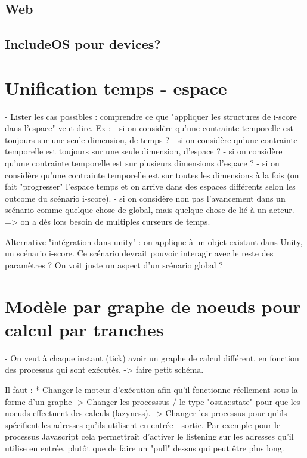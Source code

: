 \documentclass[french,a4paper]{book}
\begin{document}
\subsection{Web}

\subsection{IncludeOS pour devices?}

\section{Unification temps - espace}
- Lister les cas possibles : comprendre 
ce que "appliquer les structures de i-score dans l'espace" veut dire.
Ex : 
- si on considère qu'une contrainte temporelle est toujours sur une seule dimension, de temps ?
- si on considère qu'une contrainte temporelle est toujours sur une seule dimension, d'espace ? 
- si on considère qu'une contrainte temporelle est sur plusieurs dimensions d'espace ? 
- si on considère qu'une contrainte temporelle est sur toutes les dimensions à la fois (on fait "progresser" l'espace temps et on arrive dans des espaces différents selon les outcome du scénario i-score).
- si on considère non pas l'avancement dans un scénario comme quelque chose de global, mais quelque chose de lié à un acteur.
=> on a dès lors besoin de multiples curseurs de temps.

Alternative "intégration dans unity" : on applique à un objet existant dans Unity, un scénario i-score.
Ce scénario devrait pouvoir interagir avec le reste des paramètres ? On voit juste un aspect d'un scénario global ?

\section{Modèle par graphe de noeuds pour calcul par tranches}
- On veut à chaque instant (tick) avoir un graphe de calcul différent, en fonction des processus qui sont exécutés.
-> faire petit schéma.


Il faut : 
* Changer le moteur d'exécution afin qu'il fonctionne réellement sous la forme d'un graphe
-> Changer les processsus / le type "ossia::state" pour que les noeuds effectuent des calculs (lazyness).
-> Changer les processus pour qu'ils spécifient les adresses qu'ils utilisent en entrée - sortie.
Par exemple pour le processus Javascript cela permettrait d'activer le listening sur les adresses qu'il utilise en entrée, 
plutôt que de faire un "pull" dessus qui peut être plus long.
\end{document}
